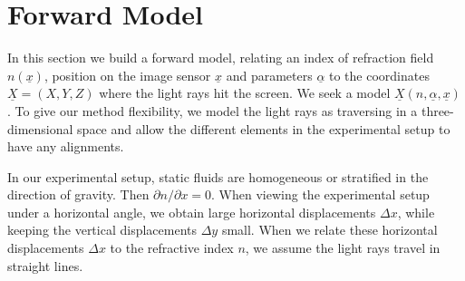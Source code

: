 \documentclass{svjour3}                     %
\begin{document}


 
\section{Forward Model}
\label{sec:formod}
In this section we build a forward model, relating an index of refraction field $n(\underline{x})$, position on the image sensor $\underline{x}$ and parameters $\underline{\alpha}$ to the coordinates $\underline{X} = (X,Y,Z)$ where the light rays hit the screen. We seek a model $\underline{X}(n, \underline{\alpha}, \underline{x})$. 
To give our method flexibility, we model the light rays as traversing in a three-dimensional space and allow the different elements in the experimental setup to have any alignments.

In our experimental setup, static fluids are homogeneous or stratified in the direction of gravity. Then $\partial n / \partial x = 0$. When viewing the experimental setup under a horizontal angle, we obtain large horizontal displacements $\Delta x$, while keeping the vertical displacements $\Delta y$ small. When we relate these horizontal displacements $\Delta x$ to the refractive index $n$, we assume the light rays travel in straight lines. 
\end{document}
